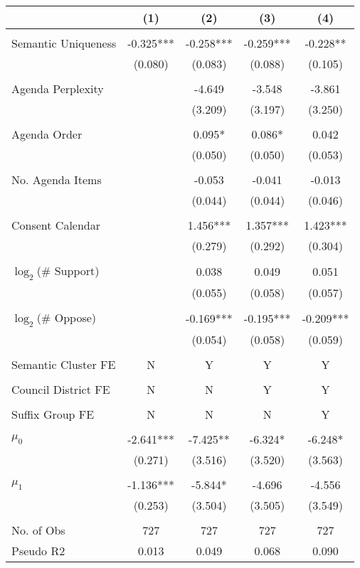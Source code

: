 \begin{tabular}{lcccc}
\toprule
 & (1) & (2) & (3) & (4) \\
\midrule
 &  &  &  &  \\
Semantic Uniqueness & -0.325*** & -0.258*** & -0.259*** & -0.228** \\
 & (0.080) & (0.083) & (0.088) & (0.105) \\
 &  &  &  &  \\
Agenda Perplexity &  & -4.649 & -3.548 & -3.861 \\
 &  & (3.209) & (3.197) & (3.250) \\
 &  &  &  &  \\
Agenda Order &  & 0.095* & 0.086* & 0.042 \\
 &  & (0.050) & (0.050) & (0.053) \\
 &  &  &  &  \\
No. Agenda Items &  & -0.053 & -0.041 & -0.013 \\
 &  & (0.044) & (0.044) & (0.046) \\
 &  &  &  &  \\
Consent Calendar &  & 1.456*** & 1.357*** & 1.423*** \\
 &  & (0.279) & (0.292) & (0.304) \\
 &  &  &  &  \\
$\log_2$(\# Support) &  & 0.038 & 0.049 & 0.051 \\
 &  & (0.055) & (0.058) & (0.057) \\
 &  &  &  &  \\
$\log_2$(\# Oppose) &  & -0.169*** & -0.195*** & -0.209*** \\
 &  & (0.054) & (0.058) & (0.059) \\
 &  &  &  &  \\
Semantic Cluster FE & N & Y & Y & Y \\
 &  &  &  &  \\
Council District FE & N & N & Y & Y \\
 &  &  &  &  \\
Suffix Group FE & N & N & N & Y \\
 &  &  &  &  \\
$\mu_0$ & -2.641*** & -7.425** & -6.324* & -6.248* \\
 & (0.271) & (3.516) & (3.520) & (3.563) \\
 &  &  &  &  \\
$\mu_1$ & -1.136*** & -5.844* & -4.696 & -4.556 \\
 & (0.253) & (3.504) & (3.505) & (3.549) \\
 &  &  &  &  \\
No. of Obs & 727 & 727 & 727 & 727 \\
Pseudo R2 & 0.013 & 0.049 & 0.068 & 0.090 \\
\bottomrule
\end{tabular}
